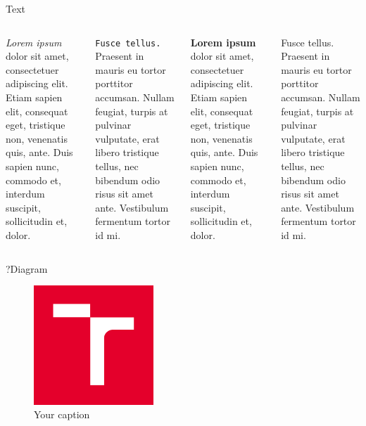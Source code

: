 \documentclass[aspectratio=1610]{beamer}
\begin{document}

\begin{frame}{Text}
    \begin{columns}
        \textit{Lorem ipsum} dolor sit amet, consectetuer adipiscing elit. Etiam sapien elit, consequat eget, tristique non, venenatis quis, ante. Duis sapien nunc, commodo et, interdum suscipit, sollicitudin et, dolor.
        \bigskip
        
        \texttt{Fusce tellus.} Praesent in mauris eu tortor porttitor accumsan. Nullam feugiat, turpis at pulvinar vulputate, erat libero tristique tellus, nec bibendum odio risus sit amet ante. Vestibulum fermentum tortor id mi.

        \textbf{Lorem ipsum} dolor sit amet, consectetuer adipiscing elit. Etiam sapien elit, consequat eget, tristique non, venenatis quis, ante. Duis sapien nunc, commodo et, interdum suscipit, sollicitudin et, dolor.
        \bigskip
        
        Fusce tellus. Praesent in mauris eu tortor porttitor accumsan. Nullam feugiat, turpis at pulvinar vulputate, erat libero tristique tellus, nec bibendum odio risus sit amet ante. Vestibulum fermentum tortor id mi.
    \end{columns}
\end{frame}

\begin{frame}{?Diagram}
    \begin{center}
        \begin{figure}
            \includegraphics[width=0.4\textwidth]{logo.png}
            \caption{Your caption}
        \end{figure}
    \end{center}
\end{frame}
\end{document}
